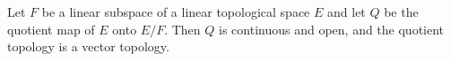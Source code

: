 Let $F$ be a linear subspace of a linear topological space $E$ and let $Q$ be the quotient map of $E$ onto $E/F$. Then $Q$ is continuous and open, and the quotient topology is a vector topology.
